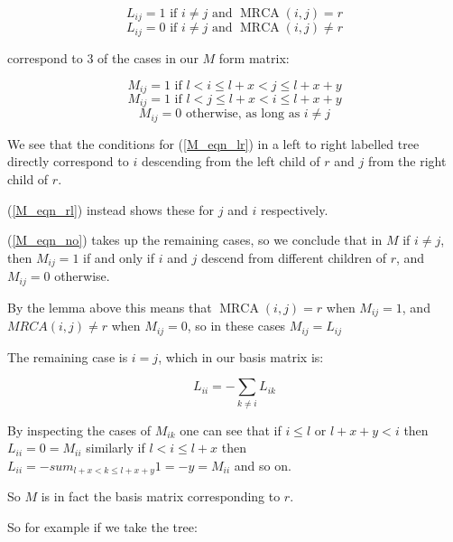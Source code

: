 \documentclass[10pt,a4paper]{report}
\DeclareMathOperator{\MRCA}{MRCA}
\begin{document}
\begin{equation} \label{L_eqn_yes}
	L_{ij} = 1 \textrm{ if } i \neq j \textrm{ and } \MRCA(i, j) = r
\end{equation}
\begin{equation} \label{L_eqn_no}
	L_{ij} = 0 \textrm{ if } i \neq j \textrm{ and } \MRCA(i, j) \neq r
\end{equation}

correspond to 3 of the cases in our $M$ form matrix:

\begin{equation} \label{M_eqn_lr}
	M_{ij} = 1 \textrm{ if } l < i \leq l + x < j \leq l + x + y
\end{equation}
\begin{equation} \label{M_eqn_rl}
	M_{ij} = 1 \textrm{ if } l < j \leq l + x < i \leq l + x + y
\end{equation}
\begin{equation} \label{M_eqn_no}
	M_{ij} = 0 \textrm{ otherwise, as long as } i \neq j
\end{equation}

We see that the conditions for (\ref{M_eqn_lr}) in a left to right labelled
tree directly correspond to $i$ descending from the left child of $r$ and $j$
from the right child of $r$.

(\ref{M_eqn_rl}) instead shows these for $j$ and $i$ respectively.

(\ref{M_eqn_no}) takes up the remaining cases, so we conclude that in $M$ if $i \neq j$, then $M_{ij} = 1$ if and only if $i$ and $j$ descend from different children of $r$, and $M_{ij} = 0$ otherwise.

By the lemma above this means that $\MRCA(i, j) = r$ when $M_{ij} = 1$, and $MRCA(i, j) \neq r$ when $M_{ij} = 0$, so in these cases $M_{ij} = L_{ij}$

The remaining case is $i = j$, which in our basis matrix is:

\begin{equation} \label{L_eqn_diag}
	L_{ii} = -\sum_{k \neq i} L_{ik}
\end{equation}

By inspecting the cases of $M_{ik}$ one can see that if $i \leq l$ or $l + x + y < i$ then $L_{ii} = 0 = M_{ii}$
similarly if $l < i \leq l + x$ then $L_{ii} = -sum_{l+x < k \leq l+x+y} 1 = -y = M_{ii}$ and so on.

So $M$ is in fact the basis matrix corresponding to $r$.

So for example if we take the tree:
\end{document}
